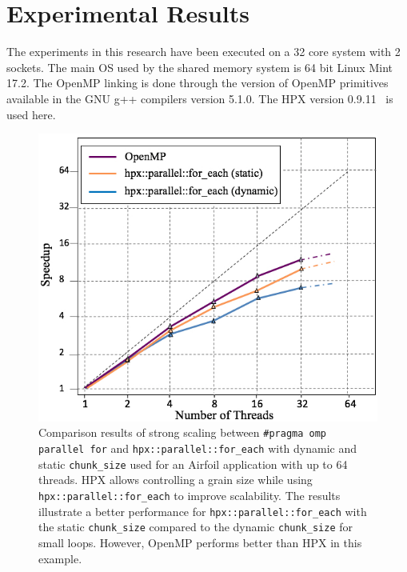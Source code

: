 \documentclass[conference]{IEEEtran}
\begin{document}
\section{Experimental Results}
\label{sec:res}

The experiments in this research have been executed on a 32 core system with 2 sockets. The main OS used by the shared memory system is 64 bit Linux Mint 17.2. The OpenMP linking is done through the version of OpenMP primitives available in the GNU g++ compilers version 5.1.0. The HPX version 0.9.11~\cite{hpx_v0.9.11} is used here.
 
\begin{figure} 
\begin{center}
\centering
\includegraphics[width=1\columnwidth]{Pictures/parallel_for_each.jpg}
\caption {\small{Comparison results of strong scaling between \texttt{\#pragma omp parallel for} and \texttt{hpx::parallel::for\_each} with dynamic and static \texttt{chunk\_size} used for an Airfoil application
with up to 64 threads. HPX allows controlling a grain size while using \texttt{hpx::parallel::for\_each} to improve scalability. The results illustrate a better performance for \texttt{hpx::parallel::for\_each} with the static \texttt{chunk\_size} compared to the dynamic \texttt{chunk\_size} for small loops. However, OpenMP performs better than HPX in this example.}}
\label{f1}
\end{center}
\end{figure}
\end{document}
